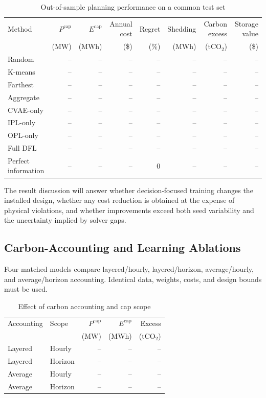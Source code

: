 \documentclass[times]{elsarticle}
\begin{document}
\begin{table}[t]
\centering
\caption{Out-of-sample planning performance on a common test set}
\label{tab:main_results}
\begin{tabular}{@{}lrrrrrrr@{}}
\toprule
Method & $P^{\mathrm{cap}}$ & $E^{\mathrm{cap}}$ & Annual cost & Regret
& Shedding & Carbon excess & Storage value \\
& (MW) & (MWh) & (\$) & (\%) & (MWh) & (tCO$_2$) & (\$) \\
\midrule
Random & -- & -- & -- & -- & -- & -- & -- \\
K-means & -- & -- & -- & -- & -- & -- & -- \\
Farthest & -- & -- & -- & -- & -- & -- & -- \\
Aggregate & -- & -- & -- & -- & -- & -- & -- \\
CVAE-only & -- & -- & -- & -- & -- & -- & -- \\
IPL-only & -- & -- & -- & -- & -- & -- & -- \\
OPL-only & -- & -- & -- & -- & -- & -- & -- \\
Full DFL & -- & -- & -- & -- & -- & -- & -- \\
Perfect information & -- & -- & -- & 0 & -- & -- & -- \\
\bottomrule
\end{tabular}
\end{table}


The result discussion will answer whether decision-focused training changes the
installed design, whether any cost reduction is obtained at the expense of
physical violations, and whether improvements exceed both seed variability and
the uncertainty implied by solver gaps.

\subsection{Carbon-Accounting and Learning Ablations}

Four matched models compare layered/hourly, layered/horizon, average/hourly,
and average/horizon accounting. Identical data, weights, costs, and design
bounds must be used.

\begin{table}[t]
\centering
\caption{Effect of carbon accounting and cap scope}
\label{tab:carbon_ablation}
\begin{tabular}{@{}llrrr@{}}
\toprule
Accounting & Scope & $P^{\mathrm{cap}}$ & $E^{\mathrm{cap}}$ & Excess \\
& & (MW) & (MWh) & (tCO$_2$) \\
\midrule
Layered & Hourly & -- & -- & -- \\
Layered & Horizon & -- & -- & -- \\
Average & Hourly & -- & -- & -- \\
Average & Horizon & -- & -- & -- \\
\bottomrule
\end{tabular}
\end{table}
\end{document}
